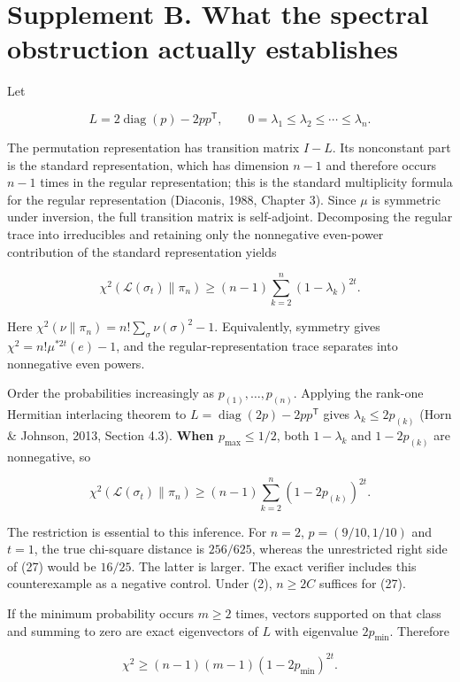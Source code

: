 \documentclass[
  british,
  11pt,
]{article}
\begin{document}
\section{Supplement B. What the spectral obstruction actually
establishes}\label{supplement-b.-what-the-spectral-obstruction-actually-establishes}

Let

\[L=2\operatorname{diag}(p)-2pp^{\mathsf T},\qquad
0=\lambda_1\le\lambda_2\le\cdots\le\lambda_n.\]

The permutation representation has transition matrix \(I-L\). Its
nonconstant part is the standard representation, which has dimension
\(n-1\) and therefore occurs \(n-1\) times in the regular
representation; this is the standard multiplicity formula for the
regular representation (Diaconis, 1988, Chapter 3). Since \(\mu\) is
symmetric under inversion, the full transition matrix is self-adjoint.
Decomposing the regular trace into irreducibles and retaining only the
nonnegative even-power contribution of the standard representation
yields

\[
\chi^2(\mathcal L(\sigma_t)\|\pi_n)
\ge(n-1)\sum_{k=2}^n(1-\lambda_k)^{2t}. \tag{26}
\]

Here \(\chi^2(\nu\|\pi_n)=n!\sum_\sigma\nu(\sigma)^2-1\). Equivalently,
symmetry gives \(\chi^2=n!\mu^{*2t}(e)-1\), and the
regular-representation trace separates into nonnegative even powers.

Order the probabilities increasingly as \(p_{(1)},\ldots,p_{(n)}\).
Applying the rank-one Hermitian interlacing theorem to
\(L=\operatorname{diag}(2p)-2pp^{\mathsf T}\) gives
\(\lambda_k\le2p_{(k)}\) (Horn \& Johnson, 2013, Section 4.3).
\textbf{When \(p_{\max}\le1/2\)}, both \(1-\lambda_k\) and
\(1-2p_{(k)}\) are nonnegative, so

\[
\chi^2(\mathcal L(\sigma_t)\|\pi_n)
\ge(n-1)\sum_{k=2}^n(1-2p_{(k)})^{2t}. \tag{27}
\]

The restriction is essential to this inference. For \(n=2\),
\(p=(9/10,1/10)\) and \(t=1\), the true chi-square distance is
\(256/625\), whereas the unrestricted right side of (27) would be
\(16/25\). The latter is larger. The exact verifier includes this
counterexample as a negative control. Under (2), \(n\ge2C\) suffices for
(27).

If the minimum probability occurs \(m\ge2\) times, vectors supported on
that class and summing to zero are exact eigenvectors of \(L\) with
eigenvalue \(2p_{\min}\). Therefore

\[\chi^2\ge(n-1)(m-1)(1-2p_{\min})^{2t}. \tag{28}\]
\end{document}
